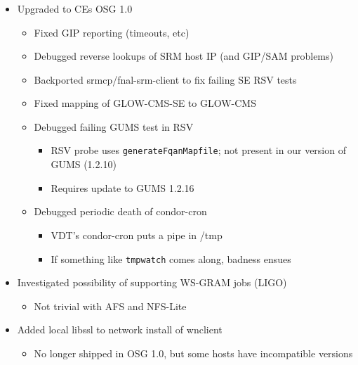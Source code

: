 \documentclass{beamer}
\begin{document}
\begin{frame}
\frametitle{}
\begin{itemize}
    \item Upgraded to CEs OSG 1.0
    \begin{itemize}
        \item Fixed GIP reporting (timeouts, etc)
        \item Debugged reverse lookups of SRM host IP (and GIP/SAM problems)
        \item Backported srmcp/fnal-srm-client to fix failing SE RSV tests
        \item Fixed mapping of GLOW-CMS-SE to GLOW-CMS
        \item Debugged failing GUMS test in RSV
        \begin{itemize}
            \item RSV probe uses {\tt generateFqanMapfile}; not present in our version of GUMS (1.2.10)
            \item Requires update to GUMS 1.2.16
        \end{itemize}
        \item Debugged periodic death of condor-cron
        \begin{itemize}
            \item VDT's condor-cron puts a pipe in /tmp
            \item If something like {\tt tmpwatch} comes along, badness ensues
        \end{itemize}
    \end{itemize}
    \item Investigated possibility of supporting WS-GRAM jobs (LIGO)
    \begin{itemize}
        \item Not trivial with AFS and NFS-Lite
    \end{itemize}
    \item Added local libssl to network install of wnclient
    \begin{itemize}
        \item No longer shipped in OSG 1.0, but some hosts have incompatible versions
    \end{itemize}
\end{itemize}
\end{frame}
\end{document}
